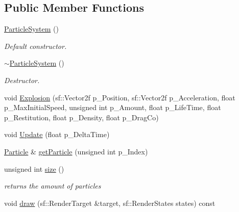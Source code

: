 \subsection*{Public Member Functions}
\begin{DoxyCompactItemize}
\item 
\mbox{\label{class_particle_system_a9028ec8023c61773dd4a668c3ad8cc26}} 
\hyperlink{class_particle_system_a9028ec8023c61773dd4a668c3ad8cc26}{Particle\+System} ()
\begin{DoxyCompactList}\small\item\em Default constructor. \end{DoxyCompactList}\item 
\mbox{\label{class_particle_system_a6bc725349a763b9d6817950cde16a93f}} 
\hyperlink{class_particle_system_a6bc725349a763b9d6817950cde16a93f}{$\sim$\+Particle\+System} ()
\begin{DoxyCompactList}\small\item\em Destructor. \end{DoxyCompactList}\item 
void \hyperlink{class_particle_system_a448310d2188470d1a95d41d88bfb802a}{Explosion} (sf\+::\+Vector2f p\+\_\+\+Position, sf\+::\+Vector2f p\+\_\+\+Acceleration, float p\+\_\+\+Max\+Initial\+Speed, unsigned int p\+\_\+\+Amount, float p\+\_\+\+Life\+Time, float p\+\_\+\+Restitution, float p\+\_\+\+Density, float p\+\_\+\+Drag\+Co)
\item 
void \hyperlink{class_particle_system_aee020d9307645eca7af65287f196d9c2}{Update} (float p\+\_\+\+Delta\+Time)
\item 
\hyperlink{class_particle}{Particle} \& \hyperlink{class_particle_system_a0b5140b76ebaa019c073e1eabb07ab4f}{get\+Particle} (unsigned int p\+\_\+\+Index)
\item 
\mbox{\label{class_particle_system_a1cb803dde4eb9c586aafffb7bdad65c9}} 
unsigned int \hyperlink{class_particle_system_a1cb803dde4eb9c586aafffb7bdad65c9}{size} ()
\begin{DoxyCompactList}\small\item\em returns the amount of particles \end{DoxyCompactList}\item 
void \hyperlink{class_particle_system_aae99e6864b2dec1343ad6e01d33dd5a1}{draw} (sf\+::\+Render\+Target \&target, sf\+::\+Render\+States states) const
\end{DoxyCompactItemize}


